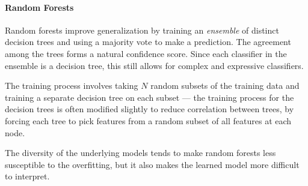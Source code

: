 %
%

\paragraph{Random Forests}
%
Random forests improve generalization by training an
\emph{ensemble} of distinct decision trees and using a majority
vote to make a prediction.
%
The agreement among the trees forms a natural
confidence score.
%
Since each classifier in the ensemble is a decision tree, this still
allows for complex and expressive classifiers.

%
%
The training process involves taking $N$ random subsets of the training
data and training a separate decision tree on each subset --- the
training process for the decision trees is often modified slightly to
reduce correlation between trees, by forcing each tree to pick features
from a random subset of all features at each node.
%

The diversity of the underlying models tends to make random forests less
susceptible to the overfitting, but it
also makes the learned model more difficult to interpret.
%


